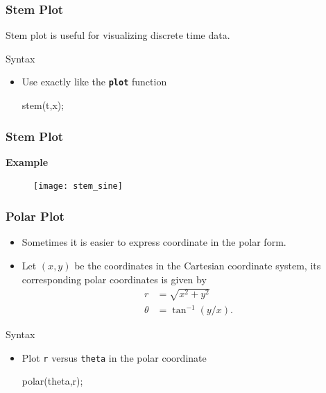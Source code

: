 \documentclass{beamer}  %
\newcommand{\tttbf}[1]{\texttt{\textbf{#1}}} %
\begin{document}
\begin{frame}[fragile]
\frametitle{Stem Plot}
Stem plot is useful for visualizing discrete time data.

\begin{block}{Syntax}
\begin{itemize}
    \item Use exactly like the \tttbf{plot} function
          \begin{matlabcodebeamer}[numbers=none,frame=none]
          stem(t,x);
          \end{matlabcodebeamer}
\end{itemize}
\end{block}

\end{frame}
\begin{frame}[fragile]
\frametitle{Stem Plot}
\textbf{Example} 

\setcounter{subfigure}{0}
\begin{figure}
    \centering
   \texttt{[image: stem\_sine]}
\end{figure}

\end{frame}
\begin{frame}[fragile]
\frametitle{Polar Plot}
\begin{itemize}[<+->]
    \item Sometimes it is easier to express coordinate in the polar form.
    \item Let $(x,y)$ be the coordinates in the Cartesian coordinate system, its corresponding polar coordinates is given by
\begin{align}
    r      &= \sqrt{x^2 + y^2} \\
    \theta &= \tan^{-1}(y/x).
\end{align}
\end{itemize}

\pause
\begin{block}{Syntax}
\begin{itemize}
    \item Plot \texttt{r} versus \texttt{theta} in the polar coordinate
          \begin{matlabcodebeamer}[numbers=none,frame=none]
          polar(theta,r);
          \end{matlabcodebeamer}
\end{itemize}
\end{block}

\end{frame}
\end{document}
